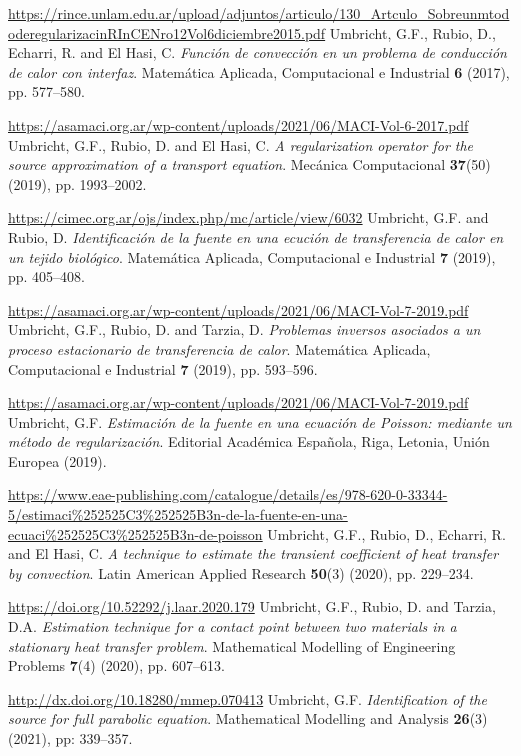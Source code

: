 \begin{thebibliography}{301}
\sloppy
\url{https://rince.unlam.edu.ar/upload/adjuntos/articulo/130_Artculo_SobreunmtododeregularizacinRInCENro12Vol6diciembre2015.pdf}
%
%
 Umbricht, G.F., Rubio, D., Echarri, R. and El Hasi, C. {\it Funci\'on de convecci\'on en un problema de conducci\'on de calor con interfaz}. Matem\'atica Aplicada, Computacional e Industrial {\bf 6} (2017), pp. 577--580. 

\sloppy
\url{https://asamaci.org.ar/wp-content/uploads/2021/06/MACI-Vol-6-2017.pdf}
%
%
 Umbricht, G.F., Rubio, D. and El Hasi, C. {\it A regularization operator for the source approximation of a transport equation}. Mec\'anica Computacional {\bf 37}(50) (2019), pp. 1993--2002.

\url{https://cimec.org.ar/ojs/index.php/mc/article/view/6032}
%
%
 Umbricht, G.F. and Rubio, D. {\it Identificaci\'on de la fuente en una ecuci\'on de transferencia de calor en un tejido biol\'ogico}. Matem\'atica Aplicada, Computacional e Industrial {\bf 7} (2019), pp. 405--408.

\url{https://asamaci.org.ar/wp-content/uploads/2021/06/MACI-Vol-7-2019.pdf}
%
%
 Umbricht, G.F., Rubio, D. and Tarzia, D. {\it Problemas inversos asociados a un proceso estacionario de transferencia de calor}. Matem\'atica Aplicada, Computacional e Industrial {\bf 7} (2019), pp. 593--596.

\url{https://asamaci.org.ar/wp-content/uploads/2021/06/MACI-Vol-7-2019.pdf}
%
%
 Umbricht, G.F. {\it Estimaci\'on de la fuente en una ecuaci\'on de Poisson: mediante un m\'etodo de regularizaci\'on}. Editorial Acad\'emica Espa\~nola, Riga, Letonia, Uni\'on Europea (2019).

\sloppy
\url{https://www.eae-publishing.com/catalogue/details/es/978-620-0-33344-5/estimaci\%252525C3\%252525B3n-de-la-fuente-en-una-ecuaci\%252525C3\%252525B3n-de-poisson}
%
%
 Umbricht, G.F., Rubio, D., Echarri, R. and El Hasi, C. {\it A technique to estimate the transient coefficient of heat transfer by convection}. Latin American Applied Research {\bf 50}(3) (2020), pp. 229--234.

\url{https://doi.org/10.52292/j.laar.2020.179}
%
%
 Umbricht, G.F., Rubio, D. and Tarzia, D.A. {\it Estimation technique for a contact point between two materials in a stationary heat transfer problem}. Mathematical Modelling of Engineering Problems {\bf 7}(4) (2020), pp. 607--613.

\url{http://dx.doi.org/10.18280/mmep.070413}
%
%
 Umbricht, G.F. {\it Identification of the source for full parabolic equation}. Mathematical Modelling and Analysis {\bf 26}(3) (2021), pp: 339--357. 


\end{thebibliography}
